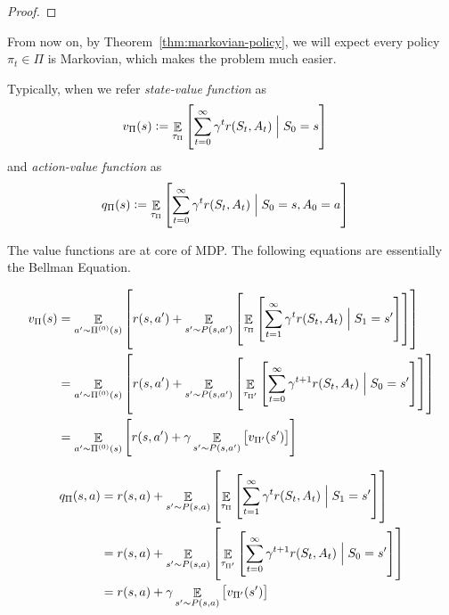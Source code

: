 \begin{proof}
\end{proof}

From now on, by Theorem~\ref{thm:markovian-policy}, we will expect every policy $\pi_t \in \Pi$ is Markovian, which makes the problem much easier.

\begin{definition}\label{def:value-functions}
    Typically, when  we refer \emph{state-value function} as
    \begin{align}
        v_\Pi(s) &:= \mathop{\mathbb{E}}_{\tau_{\Pi}} \left[ \sum_{t=0}^{\infty} \gamma^t r(S_t, A_t)  \Bigm| S_0 = s \right] \label{eq:def-state-value-function}    
    \end{align}
    and \emph{action-value function} as
    \begin{align}
        q_\Pi(s) &:= \mathop{\mathbb{E}}_{\tau_{\Pi}} \left[ \sum_{t=0}^{\infty} \gamma^t r(S_t, A_t)  \Bigm| S_0 = s, A_0 = a \right] \label{eq:def-action-value-function}
    \end{align}
\end{definition}

The value functions are at core of MDP. The following equations are essentially the Bellman Equation. 
\begin{property}
    \begin{align}
        v_\Pi(s) &= \mathop{\mathbb{E}}_{a' \sim \Pi^{(0)}(s)} \left[ r(s, a') + \mathop{\mathbb{E}}_{s' \sim P(s, a')} \left[\mathop{\mathbb{E}}_{\tau_{\Pi}} \left[ \sum_{t=1}^{\infty} \gamma^t r(S_t, A_t) \Bigm| S_1 = s' \right]\right]\right] \nonumber   \\
            &= \mathop{\mathbb{E}}_{a' \sim \Pi^{(0)}(s)} \left[ r(s, a') + \mathop{\mathbb{E}}_{s' \sim P(s, a')} \left[\mathop{\mathbb{E}}_{\tau_{\Pi'}} \left[ \sum_{t=0}^{\infty} \gamma^{t+1} r(S_t, A_t) \Bigm| S_0 = s' \right]\right]\right] \nonumber   \\
            &= \mathop{\mathbb{E}}_{a' \sim \Pi^{(0)}(s)} \left[ r(s, a') +  \gamma \mathop{\mathbb{E}}_{s' \sim P(s, a')} \left[ v_{\Pi'}(s') \right]\right] \label{eq:state-value-function}
    \end{align}
\end{property}

\begin{property}
    \begin{align}
        q_\Pi(s, a) &=  r(s, a) + \mathop{\mathbb{E}}_{s' \sim P(s, a)} \left[\mathop{\mathbb{E}}_{\tau_{\Pi}} \left[ \sum_{t=1}^{\infty} \gamma^t r(S_t, A_t) \Bigm| S_1 = s' \right]\right] \nonumber \\
            &= r(s, a) + \mathop{\mathbb{E}}_{s' \sim P(s, a)} \left[\mathop{\mathbb{E}}_{\tau_{\Pi'}} \left[ \sum_{t=0}^{\infty} \gamma^{t+1} r(S_t, A_t) \Bigm| S_0 = s' \right]\right] \nonumber  \\
            &= r(s, a) +  \gamma \mathop{\mathbb{E}}_{s' \sim P(s, a)} \left[ v_{\Pi'}(s') \right] \label{eq:action-value-function}
    \end{align}
\end{property}

